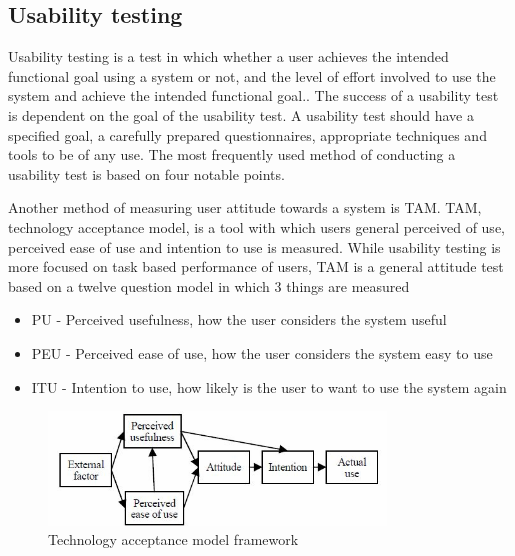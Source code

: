 \clearpage
\subsection{Usability testing}
Usability testing is a test in which whether a user achieves the intended functional goal using a system or not, and the level of effort involved to use the system and achieve the intended functional goal.\cite{iso:9126}. The success of a usability test is dependent on the goal of the usability test. A usability test should have a specified goal, a carefully prepared questionnaires, appropriate techniques and tools to be of any use. The most frequently used method of conducting a usability test is based on four notable points\cite{usability:doc2}\cite{usability:doc3}.


Another method of measuring user attitude towards a system is TAM.
TAM, technology acceptance model, is a tool with which users general perceived of use, perceived ease of use and intention to use is measured. While usability testing is more focused on  task based performance of users\cite{tam:doc4}, TAM is a general attitude test based on a twelve question model in which 3 things are measured

\begin{itemize}
\item PU - Perceived usefulness, how the user considers the system useful
\item PEU - Perceived ease of use, how the user considers the system easy to use
\item ITU - Intention to use, how likely is the user to want to use the system again
\end{itemize}

\begin{figure}[htb]
	\centering
	\includegraphics[width=0.8\textwidth]{reqspec/tam.png}
	\caption{Technology acceptance model framework\cite{tam:doc4}}
	\label{fig:tam}
\end{figure}

